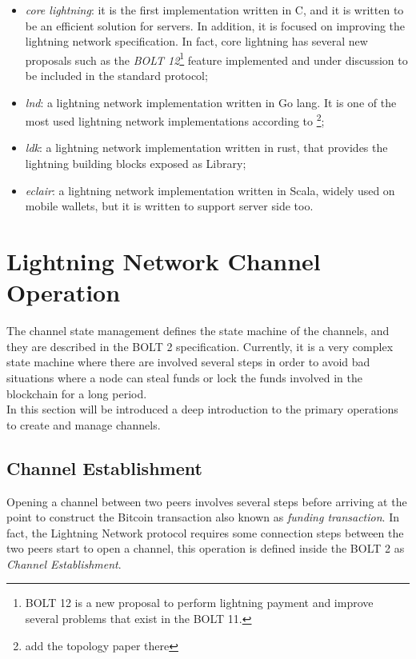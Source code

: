 \begin{itemize}
  \item \emph{core lightning}: it is the first implementation written in C, and it is written
        to be an efficient solution for servers. In addition, it is focused on improving the lightning network specification. In fact, core lightning has several new proposals such as the \emph{BOLT 12}\footnote{BOLT 12 is a new proposal to perform
        lightning payment and improve several problems that exist in the BOLT 11.} feature implemented and under discussion to be
        included in the standard protocol;
  \item \emph{lnd}: a lightning network implementation written in Go lang. It is one of the most used lightning network implementations according to \footnote{add the topology paper there};
  \item \emph{ldk}: a lightning network implementation written in rust, that provides the lightning building blocks exposed as Library;
  \item \emph{eclair}: a lightning network implementation written in Scala, widely used on mobile wallets, but it is written to
        support server side too.
\end{itemize}

\section{Lightning Network Channel Operation}
\label{sec:channel_state}

The channel state management defines the state machine of the channels, and they are described in the BOLT 2 specification. Currently, it is a very complex
state machine where there are involved several steps in order to avoid bad
situations where a node can steal funds or lock the funds involved in the blockchain for a long period.\\
In this section will be introduced a deep introduction to the primary operations to create and manage channels.

\subsection{Channel Establishment}
\label{sec:open_a_channels}

Opening a channel between two peers involves several steps before arriving at the point to construct the Bitcoin transaction also
known as \emph{funding transaction}.
In fact, the Lightning Network protocol requires some connection steps between the two peers start to open a channel, this
operation is defined inside the BOLT 2\cite{bolt2} as \emph{Channel Establishment}.

